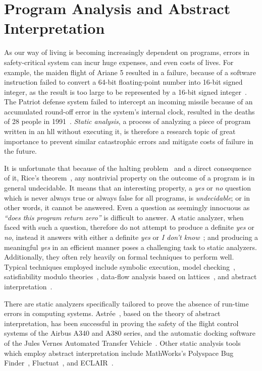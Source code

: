 \section{Program Analysis and Abstract Interpretation}
\label{bg:sec:abstract_interpretation}

As our way of living is becoming increasingly dependent on programs, errors
in safety-critical system can incur huge expenses, and even costs of lives.
For example, the maiden flight of Ariane 5 resulted in a failure, because of
a software instruction failed to convert a 64-bit floating-point number into
16-bit signed integer, as the result is too large to be represented by a 16-bit
signed integer~\cite{dowson97}.  The Patriot defense system failed to intercept
an incoming missile because of an accumulated round-off error in the system's
internal clock, resulted in the deaths of 28 people in 1991~\cite{patriot}.
\emph{Static analysis}, a process of analyzing a piece of program written in
an \gls{hll} without executing it, is therefore a research topic of great
importance to prevent similar catastrophic errors and mitigate costs of failure
in the future.

It is unfortunate that because of the halting problem~\cite{turing37} and
a direct consequence of it, Rice's theorem~\cite{rice53}, any nontrivial
property on the outcome of a program is in general undecidable.  It means that
an interesting property, a \emph{yes} or \emph{no} question which is never
always true or always false for all programs, is \emph{undecidable}; or in
other words, it cannot be answered.  Even a question as seemingly innocuous
as \emph{``does this program return zero''} is difficult to answer.  A static
analyzer, when faced with such a question, therefore do not attempt to
produce a definite \emph{yes} or \emph{no}, instead it answers with either
a definite \emph{yes} or \emph{I don't know}~\cite{mine04}; and producing a
meaningful \emph{yes} in an efficient manner poses a challenging task to static
analyzers.  Additionally, they often rely heavily on formal techniques to
perform well.  Typical techniques employed include symbolic execution, model
checking~\cite{kroening03}, satisfiability modulo theories~\cite{demoura08},
data-flow analysis based on lattices~\cite{nielson99}, and abstract
interpretation~\cite{cousot77}.

There are static analyzers specifically tailored to prove the absence of
run-time errors in computing systems.  Astr\'ee~\cite{astree}, based on
the theory of abstract interpretation, has been successful in proving the
safety of the flight control systems of the Airbus A340 and A380 series,
and the automatic docking software of the Jules Vernes Automated Transfer
Vehicle~\cite{dasia09}.  Other static analysis tools which employ abstract
interpretation include MathWorks's Polyspace Bug Finder~\cite{polyspace},
Fluctuat~\cite{Fluctuat}, and ECLAIR~\cite{eclair}.

